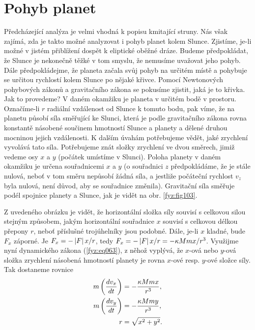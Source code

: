   \section{Pohyb planet}\label{fyz:IchapIXsecVII}
    Předcházející analýza je velmi vhodná k popisu kmitající stru\-ny. Nás však zajímá, zda je 
    takto 
    možné analyzovat i pohyb planet kolem Slunce. Zjistíme, je-li možné v jistém přiblížení dospět 
    k eliptické oběžné dráze. Budeme předpokládat, že Slunce je nekonečně těžké v tom smyslu, že 
    nemusíme uvažovat jeho pohyb. Dále předpokládejme, že planeta začala svůj pohyb na určitém 
    místě a pohybuje se určitou rychlostí kolem Slunce po nějaké křivce. Pomocí Newtonových 
    pohybových zákonů a gravitačního zákona se pokusíme zjistit, jaká je to křivka. Jak to 
    provedeme? V daném okamžiku je planeta v určitém bodě v prostoru. Označíme-li \(r\) radiální 
    vzdálenost od Slunce k tomuto bodu, pak víme, že na planetu působí síla směřující ke Slunci, 
    která je podle gravitačního zákona rovna konstantě násobené součinem hmotností Slunce a planety 
    a dělené druhou mocninou jejich vzdálenosti. K dalším úvahám potřebujeme vědět, jaké zrychlení 
    vyvolává tato síla. Potřebujeme znát složky zrychlení ve dvou směrech, jimiž vedeme osy \(x\) a 
    \(y\) (počátek umístíme v Slunci). Poloha planety v daném okamžiku je určena souřadnicemi \(x\) 
    a \(y\) (o souřadnici \(z\) předpokládáme, že je stále nulová, neboť v tom směru nepůsobí žádná 
    síla, a jestliže počáteční rychlost \(v_z\) byla nulová, není důvod, aby se souřadnice 
    změnila). Gravitační síla směřuje podél spojnice planety a Slunce, jak je vidět na obr. 
    \ref{fyz:fig103}.


    Z uvedeného obrázku je vidět, že horizontální složka síly souvisí s celkovou silou stejným 
    způsobem, jakým horizontální souřadnice \(x\) souvisí s celkovou délkou přepony \(r\), neboť 
    příslušné trojúhelníky jsou podobné. Dále, je-li \(x\) kladné, bude \(F_x\) záporné. Je \(F_x = 
    -\left\lvert F\right\rvert x/r\), tedy \(F_x = -\left\lvert F\right\rvert x/r = -\kappa Mmx/r^3\). Využijme nyní dynamického zákona 
    (\ref{fyz:eq063}), z něhož vyplývá, že \(x\)-ová nebo \(y\)-ová složka zrychlení násobená 
    hmotností planety je rovna \(x\)-ové resp. \(y\)-ové složce síly. Tak dostaneme rovnice
    \begin{subequations}\label{fyz:eq133}
      \begin{align} 
        m\left(\dfrac{d v_x}{d t}\right) &= -\frac{\kappa Mmx}{r^3}, \label{fyz:eq133a}   \\
        m\left(\dfrac{d v_y}{d t}\right) &= -\frac{\kappa Mmy}{r^3}, \label{fyz:eq133b}   \\
                                r &= \sqrt{x^2+y^2}.          \label{fyz:eq133c} 
      \end{align}
    \end{subequations}
    
